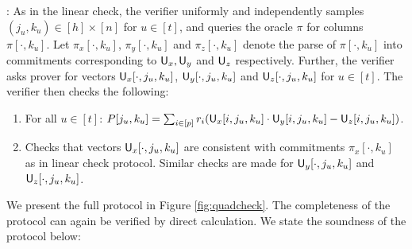 : As in the linear check, the
verifier uniformly and independently samples $(j_u,k_u)\in [h]\times [n]$ for
$u\in [t]$, and queries the oracle $\pi$ for columns $\pi[\cdot,k_u]$. Let
$\pi_x[\cdot,k_u]$, $\pi_y[\cdot,k_u]$ and $\pi_z[\cdot,k_u]$ denote the parse
of $\pi[\cdot,k_u]$ into commitments corresponding to $\mathsf{U}_x,\mathsf{U}_y$ and
$\mathsf{U}_z$ respectively. Further, the verifier asks prover for vectors
$\mathsf{U}_x[\cdot,j_u,k_u]$, $\mathsf{U}_y[\cdot,j_u,k_u]$ and $\mathsf{U}_z[\cdot,j_u,k_u]$
for $u\in [t]$. The verifier then checks the following:
\begin{enumerate}[{\rm (i)}]
\item For all $u\in [t]$: $P[j_u,k_u]=\sum_{i\in
[p]}r_i(\mathsf{U}_x[i,j_u,k_u]\cdot\mathsf{U}_y[i,j_u,k_u]-\mathsf{U}_z[i,j_u,k_u])$.
\item Checks that vectors $\mathsf{U}_x[\cdot,j_u,k_u]$ are consistent with
commitments $\pi_x[\cdot,k_u]$ as in linear check protocol. Similar checks are
made for $\mathsf{U}_y[\cdot,j_u,k_u]$ and $\mathsf{U}_z[\cdot,j_u,k_u]$.
\end{enumerate}
We present the full protocol in Figure \ref{fig:quadcheck}. The completeness of
the protocol can again be verified by direct calculation. We state the soundness
of the protocol below:
